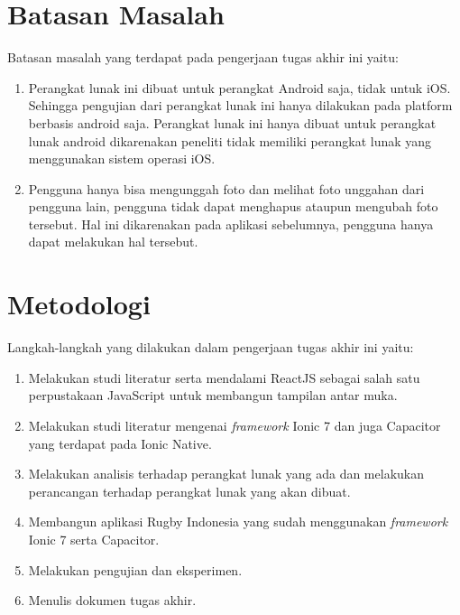 \section{Batasan Masalah}
\label{sec:batasan}
Batasan masalah yang terdapat pada pengerjaan tugas akhir ini yaitu:
\begin{enumerate}
    \item Perangkat lunak ini dibuat untuk perangkat Android saja, tidak untuk iOS. Sehingga pengujian dari perangkat lunak ini hanya dilakukan pada platform berbasis android saja. Perangkat lunak ini hanya dibuat untuk perangkat lunak android dikarenakan peneliti tidak memiliki perangkat lunak yang menggunakan sistem operasi iOS.
    \item Pengguna hanya bisa mengunggah foto dan melihat foto unggahan dari pengguna lain, pengguna tidak dapat menghapus ataupun mengubah foto tersebut. Hal ini dikarenakan pada aplikasi sebelumnya, pengguna hanya dapat melakukan hal tersebut.
\end{enumerate}


\section{Metodologi}
\label{sec:metlit}
Langkah-langkah yang dilakukan dalam pengerjaan tugas akhir ini yaitu:
\begin{enumerate}
    \item Melakukan studi literatur serta mendalami ReactJS sebagai salah satu perpustakaan JavaScript untuk membangun tampilan antar muka.
    \item Melakukan studi literatur mengenai \textit{framework} Ionic 7 dan juga Capacitor yang terdapat pada Ionic Native.
    \item Melakukan analisis terhadap perangkat lunak yang ada dan melakukan perancangan terhadap perangkat lunak yang akan dibuat.
    \item Membangun aplikasi Rugby Indonesia yang sudah menggunakan \textit{framework} Ionic 7 serta Capacitor.
    \item Melakukan pengujian dan eksperimen.
    \item Menulis dokumen tugas akhir.
\end{enumerate}

